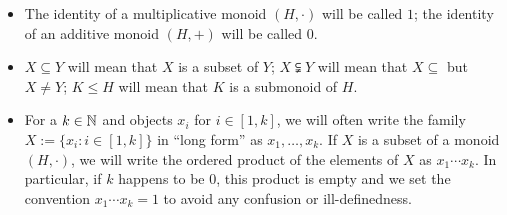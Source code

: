 \begin{itemize}
	\item The identity of a multiplicative monoid $(H,\cdot)$ will be called $1$; the identity of an additive monoid $(H,+)$ will be called $0$.
	
	\item $X\subseteq Y$ will mean that $X$ is a subset of $Y$; $X\subsetneqq Y$ will mean that $X\subseteq$ but $X\neq Y$; $K\le H$ will mean that $K$ is a submonoid of $H$.
	
	\item For a $k\in \mathbb{N}$ and objects $x_i$ for $i\in [1,k]$, we will often write the family $X:=\{x_i: i\in [1,k]\}$ in ``long form'' as $x_1,\dots,x_k$.
	If $X$ is a subset of a monoid $(H,\cdot)$, we will write the ordered product of the elements of $X$ as $x_1\cdots x_k$.
	In particular, if $k$ happens to be $0$, this product is empty and we set the convention $x_1\cdots x_k = 1$ to avoid any confusion or ill-definedness.
\end{itemize}




